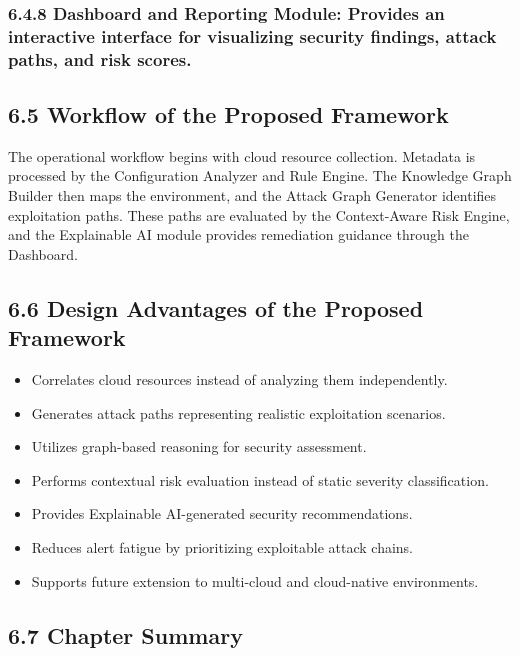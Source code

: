 \subsubsection{6.4.8 Dashboard and Reporting Module: Provides an interactive interface for visualizing security findings, attack paths, and risk scores.}

\subsection{6.5 Workflow of the Proposed Framework}

The operational workflow begins with cloud resource collection. Metadata is processed by the Configuration Analyzer and Rule Engine. The Knowledge Graph Builder then maps the environment, and the Attack Graph Generator identifies exploitation paths. These paths are evaluated by the Context-Aware Risk Engine, and the Explainable AI module provides remediation guidance through the Dashboard.

\subsection{6.6 Design Advantages of the Proposed Framework}

\begin{itemize}
\tightlist
\item
  Correlates cloud resources instead of analyzing them independently.\\
\item
  Generates attack paths representing realistic exploitation scenarios.\\
\item
  Utilizes graph-based reasoning for security assessment.\\
\item
  Performs contextual risk evaluation instead of static severity classification.\\
\item
  Provides Explainable AI-generated security recommendations.\\
\item
  Reduces alert fatigue by prioritizing exploitable attack chains.\\
\item
  Supports future extension to multi-cloud and cloud-native environments.
\end{itemize}

\subsection{6.7 Chapter Summary}

